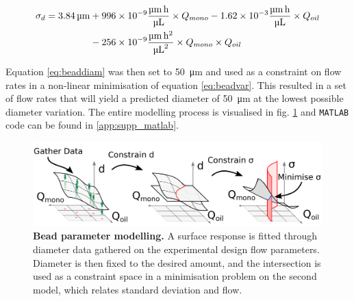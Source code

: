 \begin{equation}
\label{eq:beadvar}
	\begin{aligned}
	\sigma_{d} = \SI{3.84}{\um} & + \num{996e-9} \SI[per-mode=fraction]{}{\um\hour\per\ul} \times Q_{mono} - \num{1.62e-3} \SI[per-mode=fraction]{}{\um\hour\per\ul} \times Q_{oil}\\
	& - \num{256e-9} \SI[per-mode=fraction]{}{\um\hour\squared\per\ul\squared}
	\times Q_{mono}\times Q_{oil}\\
	\end{aligned}
\tagaddtext{[\si{\micro\metre}]}
\end{equation}

Equation \ref{eq:beaddiam} was then set to \SI{50}{\micro\metre} and used as a constraint on flow rates in a non-linear minimisation of equation \ref{eq:beadvar}. This resulted in a set of flow rates that will yield a predicted diameter of \SI{50}{\micro\metre} at the lowest possible diameter variation. The entire modelling process is visualised in fig. \ref{fig:indrop_model} and \verb|MATLAB| code can be found in \ref{app:supp_matlab}.\pms

\begin{figure}[ht]
\centerfloat
\includegraphics[width=\textwidth]{./ims/indrop_model.png}
\caption[Bead parameter modelling]{\textbf{Bead parameter modelling.} A surface response is fitted through diameter data gathered on the experimental design flow parameters. Diameter is then fixed to the desired amount, and the intersection is used as a constraint space in a minimisation problem on the second model, which relates standard deviation and flow.}
\label{fig:indrop_model}
\end{figure}

